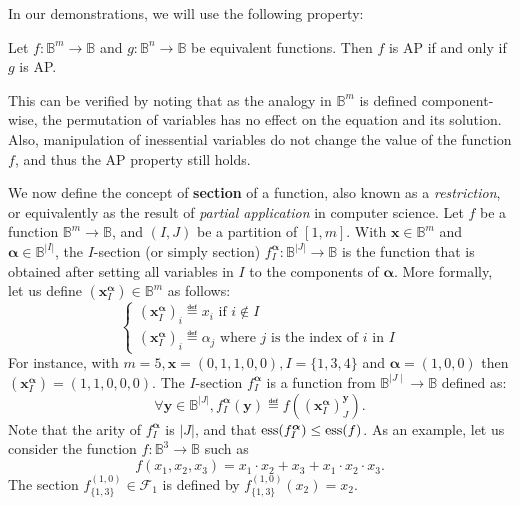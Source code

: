 In our demonstrations, we will use the following property:

\begin{property}\label{equivalent_functions}
Let $f\colon \mathbb{B}^m\to \mathbb{B}$ and $g\colon \mathbb{B}^n\to
  \mathbb{B}$ be equivalent functions. Then $f$ is AP if and only if $g$ is AP.
\end{property}

This can be verified by noting that as the analogy in $\mathbb{B}^m$ is defined
component-wise, the permutation of variables has no effect on the equation and
its solution. Also, manipulation of inessential variables do not change the
value of the function $f$, and thus the AP property still holds.

We now define the concept of \textbf{section} of a function, also known as a
\textit{restriction}, or equivalently as the result of \textit{partial
application} in computer science. Let $f$ be a function $\mathbb{B}^m\to \mathbb{B}$, and $(I,
J)$ be a partition of $[1, m]$. With $\mathbf{x}
\in \mathbb{B}^m$ and $\boldsymbol{\alpha} \in \mathbb{B}^{|I|}$, the $I$-section (or simply
section) $f^{\boldsymbol{\alpha}}_I \colon \mathbb{B}^{|J|} \to \mathbb{B}$ is the function that
is obtained after setting all variables in $I$ to the components of
$\boldsymbol{\alpha}$.
More formally, let us define $(\mathbf{x}^{\boldsymbol{\alpha}}_I) \in \mathbb{B}^m$
as follows:
$$
\begin{cases}
(\mathbf{x}^{\boldsymbol{\alpha}}_I)_i \eqdef x_i \mbox{ if } i \notin I\\
(\mathbf{x}^{\boldsymbol{\alpha}}_I)_i \eqdef \alpha_j \mbox{ where } j \mbox{ is the index of } i \mbox{ in } I
\end{cases}
$$
For instance, with $m=5, \mathbf{x}=(0,1,1,0,0), I=\{1,3,4\}$ and $\boldsymbol{\alpha}=(1,0,0)$ then
$(\mathbf{x}^{\boldsymbol{\alpha}}_I)=(1,1,0,0,0)$.
The $I$-section $f^{\boldsymbol{\alpha}}_I$ is a function from $\mathbb{B}^{\mid
J \mid} \to \mathbb{B}$ defined as:
$$\forall \mathbf{y} \in \mathbb{B}^{|J|},
f^{\boldsymbol{\alpha}}_I(\mathbf{y}) \eqdef
f((\mathbf{x}^{\boldsymbol{\alpha}}_I)^\mathbf{y}_J).$$
Note that the arity of $f^{\boldsymbol{\alpha}}_I$ is $|J|$, and that
$\operatorname{ess}(f^{\boldsymbol{\alpha}}_I) \leq \operatorname{ess}(f)$.
As an example, let us consider the function $f\colon \mathbb{B}^3 \to
\mathbb{B}$ such as $$f(x_1,x_2, x_3) = x_1 \cdot x_2 +
x_3 + x_1 \cdot x_2 \cdot x_3.$$ The section $f^{(1, 0)}_{\{1, 3\}}   \in
\mathcal{F}_1$ is defined by $f^{(1, 0)}_{\{1, 3\}}(x_2) = x_2$.

